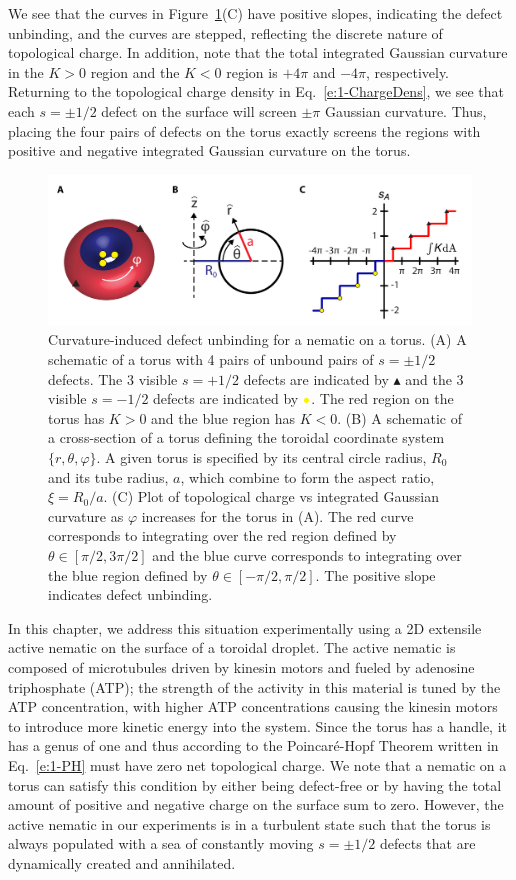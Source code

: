 We see that the curves in Figure~\ref{f:3-EqDefs}(C) have positive slopes, indicating the defect unbinding, and the curves are stepped, reflecting the discrete nature of topological charge.
In addition, note that the total integrated Gaussian curvature in the $K>0$ region and the $K<0$ region is $+4 \pi$ and $-4\pi$, respectively.
Returning to the topological charge density in Eq.~\ref{e:1-ChargeDens}, we see that each $s = \pm 1/2$ defect on the surface will screen $\pm \pi$ Gaussian curvature.
Thus, placing the four pairs of defects on the torus exactly screens the regions with positive and negative integrated Gaussian curvature on the torus.
\begin{figure}
  \includegraphics{figures/C3/Ch3-Figs_EqDefs.png}
  \caption{Curvature-induced defect unbinding for a nematic on a torus. (A) A schematic of a torus with 4 pairs of unbound pairs of $s = \pm 1/2$ defects. The 3 visible $s=+1/2$ defects are indicated by $\blacktriangle$ and the 3 visible $s = -1/2$ defects are indicated by ${\color{yellow} \bullet}$.
  The red region on the torus has $K >0$ and the blue region has $K<0$.
  (B) A schematic of a cross-section of a torus defining the toroidal coordinate system $\{r, \theta, \varphi \}$.
  A given torus is specified by its central circle radius, $R_0$ and its tube radius, $a$, which combine to form the aspect ratio, $\xi = R_0/a$.
  (C) Plot of topological charge vs integrated Gaussian curvature as $\varphi$ increases for the torus in (A).
  The red curve corresponds to integrating over the red region defined by $\theta \in [\pi/2,3 \pi/2]$ and the blue curve corresponds to integrating over the blue region defined by $\theta \in [-\pi/2,\pi/2]$. The positive slope indicates defect unbinding.}\label{f:3-EqDefs}
\end{figure}

In this chapter, we address this situation experimentally using a 2D extensile active nematic on the surface of a toroidal droplet.
The active nematic is composed of microtubules driven by kinesin motors and fueled by adenosine triphosphate (ATP); the strength of the activity in this material is tuned by the ATP concentration, with higher ATP concentrations causing the kinesin motors to introduce more kinetic energy into the system.
Since the torus has a handle, it has a genus of one and thus according to the Poincar\'e-Hopf Theorem written in Eq.~\ref{e:1-PH} must have zero net topological charge.
We note that a nematic on a torus can satisfy this condition by either being defect-free or by having the total amount of positive and negative charge on the surface sum to zero.
However, the active nematic in our experiments is in a turbulent state such that the torus is always populated with a sea of constantly moving $s = \pm 1/2$ defects that are dynamically created and annihilated.


